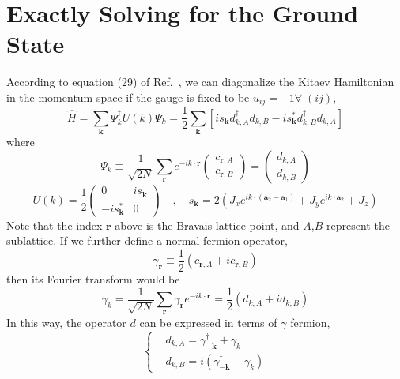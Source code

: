\documentclass[12font]{article}
\theoremstyle{definition}
\newcommand{\lr}[1]{\left(  #1  \right)}
\newcommand{\lrm}[1]{\left[  #1  \right]}
\newcommand{\bo}[1]{\mathbf{#1}}
\begin{document}
\section{Exactly Solving for the Ground State}
According to equation (29) of Ref.~\cite{Kitaev_2006}, we can diagonalize the Kitaev Hamiltonian in the momentum space if the gauge is fixed to be $u_{ij} = +1\forall\; (ij)$, 
\[\hat{H} = \sum_{\bo{k}}\Psi^\dagger_{k}U(k)\Psi_{k} = \frac{1}{2}\sum_{\bo{k}}\lrm{is_{\bo{k}}d_{k,A}^\dagger d_{k,B} - is_{\bo{k}}^*d_{k,B}^\dagger d_{k,A}}\]
where
\[\Psi_k \equiv \frac{1}{\sqrt{2N}}\sum_{\bo{r}}e^{-ik\cdot \bo{r}}\begin{pmatrix}
                                                             c_{\bo{r},A} \\
                                                             c_{\bo{r},B}
                                                           \end{pmatrix} = \begin{pmatrix}
                                                                             d_{k,A} \\
                                                                             d_{k,B}
                                                                           \end{pmatrix}\]
\[U(k) = \frac{1}{2}\begin{pmatrix}
                      0 & is_{\bo{k}} \\
                      -is_{\bo{k}}^* & 0 
                    \end{pmatrix} \quad , \quad s_{\bo{k}} = 2\lr{J_xe^{ik\cdot \lr{\bo{a}_2 - \bo{a}_1}} + J_ye^{ik\cdot \bo{a}_2} + J_z}\]
Note that the index $\bo{r}$ above is the Bravais lattice point, and $A$,$B$ represent the sublattice. If we further define a normal fermion operator, 
\begin{equation}\label{gamm def.e}
  \gamma_{\bo{r}} \equiv \frac{1}{2}\lr{c_{{\bo{r}},A} + ic_{{\bo{r}},B}}
\end{equation}
 then its Fourier transform would be 
\[\gamma_{k} = \frac{1}{\sqrt{2N}}\sum_{{\bo{r}}}\gamma_{{\bo{r}}}e^{-ik\cdot \bo{r}} = \frac{1}{2}\lr{d_{k,A} + id_{k,B}}\]
In this way, the operator $d$ can be expressed in terms of $\gamma$ fermion,
\[
\left\{
\begin{aligned}
& d_{k,A} = \gamma_{-\bo{k}}^\dagger + \gamma_{k} \\
& d_{k,B} = i\lr{\gamma_{-\bo{k}}^\dagger - \gamma_{k}}
\end{aligned}
\right.
\]
\end{document}
